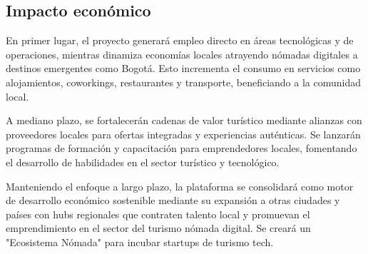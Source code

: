 \subsection{Impacto económico}

En primer lugar, el proyecto generará empleo directo en áreas tecnológicas y de operaciones, mientras dinamiza economías locales atrayendo nómadas digitales a destinos emergentes como Bogotá. Esto incrementa el consumo en servicios como alojamientos, coworkings, restaurantes y transporte, beneficiando a la comunidad local.

A mediano plazo, se fortalecerán cadenas de valor turístico mediante alianzas con proveedores locales para ofertas integradas y experiencias auténticas. Se lanzarán programas de formación y capacitación para emprendedores locales, fomentando el desarrollo de habilidades en el sector turístico y tecnológico.

Manteniendo el enfoque a largo plazo, la plataforma se consolidará como motor de desarrollo económico sostenible mediante su expansión a otras ciudades y países con hubs regionales que contraten talento local y promuevan el emprendimiento en el sector del turismo nómada digital. Se creará un "Ecosistema Nómada" para incubar startups de turismo tech.
